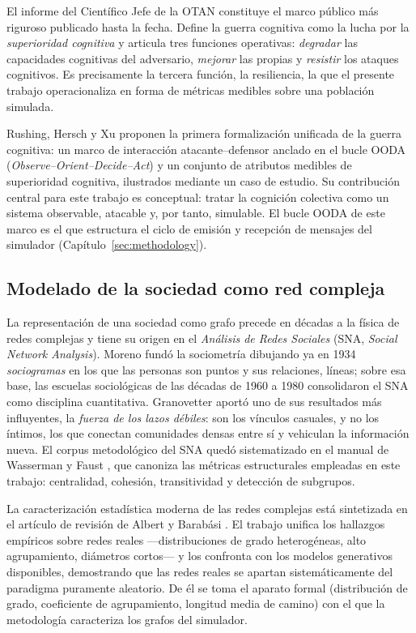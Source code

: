 \documentclass[12pt]{extarticle}
\numberwithin{equation}{section}
\begin{document}
El informe del Cient\'ifico Jefe de la OTAN \cite{NATOChiefScientist2025} constituye el marco p\'ublico m\'as riguroso publicado hasta la fecha. Define la guerra cognitiva como la lucha por la \emph{superioridad cognitiva} y articula tres funciones operativas: \emph{degradar} las capacidades cognitivas del adversario, \emph{mejorar} las propias y \emph{resistir} los ataques cognitivos. Es precisamente la tercera funci\'on, la resiliencia, la que el presente trabajo operacionaliza en forma de m\'etricas medibles sobre una poblaci\'on simulada.

Rushing, Hersch y Xu \cite{RushingHerschXu2026} proponen la primera formalizaci\'on unificada de la guerra cognitiva: un marco de interacci\'on atacante--defensor anclado en el bucle OODA (\emph{Observe--Orient--Decide--Act}) y un conjunto de atributos medibles de superioridad cognitiva, ilustrados mediante un caso de estudio. Su contribuci\'on central para este trabajo es conceptual: tratar la cognici\'on colectiva como un sistema observable, atacable y, por tanto, simulable. El bucle OODA de este marco es el que estructura el ciclo de emisi\'on y recepci\'on de mensajes del simulador (Cap\'itulo~\ref{sec:methodology}).

\subsection{Modelado de la sociedad como red compleja}

La representaci\'on de una sociedad como grafo precede en d\'ecadas a la f\'isica de redes complejas y tiene su origen en el \emph{An\'alisis de Redes Sociales} (SNA, \emph{Social Network Analysis}). Moreno \cite{Moreno1934} fund\'o la sociometr\'ia dibujando ya en 1934 \emph{sociogramas} en los que las personas son puntos y sus relaciones, l\'ineas; sobre esa base, las escuelas sociol\'ogicas de las d\'ecadas de 1960 a 1980 consolidaron el SNA como disciplina cuantitativa. Granovetter \cite{Granovetter1973} aport\'o uno de sus resultados m\'as influyentes, la \emph{fuerza de los lazos d\'ebiles}: son los v\'inculos casuales, y no los \'intimos, los que conectan comunidades densas entre s\'i y vehiculan la informaci\'on nueva. El corpus metodol\'ogico del SNA qued\'o sistematizado en el manual de Wasserman y Faust \cite{WassermanFaust1994}, que canoniza las m\'etricas estructurales empleadas en este trabajo: centralidad, cohesi\'on, transitividad y detecci\'on de subgrupos.

La caracterizaci\'on estad\'istica moderna de las redes complejas est\'a sintetizada en el art\'iculo de revisi\'on de Albert y Barab\'asi \cite{AlbertBarabasi2002}. El trabajo unifica los hallazgos emp\'iricos sobre redes reales —distribuciones de grado heterog\'eneas, alto agrupamiento, di\'ametros cortos— y los confronta con los modelos generativos disponibles, demostrando que las redes reales se apartan sistem\'aticamente del paradigma puramente aleatorio. De \'el se toma el aparato formal (distribuci\'on de grado, coeficiente de agrupamiento, longitud media de camino) con el que la metodolog\'ia caracteriza los grafos del simulador.
\end{document}

